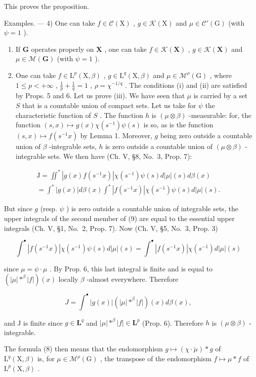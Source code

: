 This proves the proposition.

Examples. --- 4) One can take \(f \in \mathcal{C}(\mathrm{X})\) , \(g \in \mathcal{K}(\mathrm{X})\) and \(\mu \in \mathcal{C}'(\mathrm{G})\) (with \(\psi = 1\) ).

\begin{enumerate}
\def\labelenumi{\arabic{enumi})}
\setcounter{enumi}{4}
\item
  If \(\mathbf{G}\) operates properly on \(\mathbf{X}\) , one can take \(f \in \mathcal{K}(\mathbf{X})\) , \(g \in \mathcal{K}(\mathbf{X})\) and \(\mu \in \mathcal{M}(\mathbf{G})\) (with \(\psi = 1\) ).
\item
  One can take \(f \in \mathrm{L}^p(\mathrm{X},\beta)\) , \(g \in \mathrm{L}^q(\mathrm{X},\beta)\) and \(\mu \in \mathcal{M}^\rho(\mathrm{G})\) , where \(1 \leqslant p < +\infty\) , \(\frac{1}{p} + \frac{1}{q} = 1\) , \(\rho = \chi^{-1/q}\) . The conditions (i) and (ii) are satisfied by Props. 5 and 6. Let us prove (iii). We have seen that \(\mu\) is carried by a set \(S\) that is a countable union of compact sets. Let us take for \(\psi\) the characteristic function of \(S\) . The function \(h\) is \((\mu \otimes \beta)\) -measurable: for, the function \((s,x) \mapsto g(x)\chi(s^{-1})\psi(s)\) is so, as is the function \((s,x) \mapsto f(s^{-1}x)\) by Lemma 1. Moreover, \(g\) being zero outside a countable union of \(\beta\) -integrable sets, \(h\) is zero outside a countable union of \((\mu \otimes \beta)\) -integrable sets. We then have (Ch. V, §8, No.~3, Prop. 7):
\end{enumerate}

\[
\begin{array}{l} \mathrm{J} = \iint^ {*} | g (x) f (s ^ {- 1} x) | \chi (s ^ {- 1}) \psi (s) d | \mu | (s) d \beta (x) \\ = \int^ {*} | g (x) | d \beta (x) \int^ {*} | f (s ^ {- 1} x) | \chi (s ^ {- 1}) \psi (s) d | \mu | (s). \end{array}\tag{9}
\]

But since \(g\) (resp. \(\psi\) ) is zero outside a countable union of integrable sets, the upper integrals of the second member of (9) are equal to the essential upper integrals (Ch. V, §1, No.~2, Prop. 7). Now (Ch. V, §5, No.~3, Prop. 3)

\[
\int^ {\bullet} | f (s ^ {- 1} x) | \chi (s ^ {- 1}) \psi (s) d | \mu | (s) = \int^ {\bullet} | f (s ^ {- 1} x) | \chi (s ^ {- 1}) d | \mu | (s)
\]

since \(\mu = \psi \cdot \mu\) . By Prop. 6, this last integral is finite and is equal to \((|\mu| *^{\beta} |f|)(x)\) locally \(\beta\) -almost everywhere. Therefore

\[
J = \int^ {\bullet} | g (x) | \left(| \mu | * ^ {\beta} | f |\right) (x) d \beta (x),
\]

and J is finite since \(g \in \mathbf{L}^q\) and \(|\mu| *^\beta |f| \in \mathbf{L}^p\) (Prop. 6). Therefore \(h\) is \((\mu \otimes \beta)\) -integrable.

The formula (8) then means that the endomorphism \(g \mapsto (\chi \cdot \breve{\mu}) * g\) of \(\mathrm{L}^q(\mathrm{X},\beta)\) is, for \(\mu \in \mathcal{M}^\rho(\mathrm{G})\) , the transpose of the endomorphism \(f \mapsto \mu * f\) of \(\mathrm{L}^p(\mathrm{X},\beta)\) .

